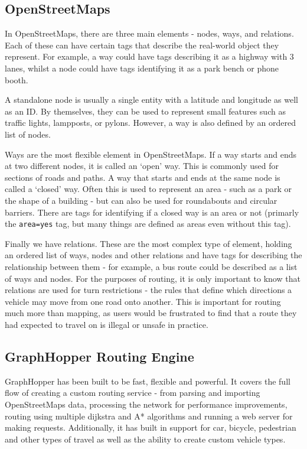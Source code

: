 \documentclass[ %
                    author={Alexander Hill},
                supervisor={Dr. Benjamin Sach},
                    degree={MEng},
                     title={MARMOSET},
                  subtitle={Multi-Agent Route Management using Online Simulation for Efficient Transportation},
                      type={research},
                      year={2016} ]{dissertation}
\begin{document}
\subsection{OpenStreetMaps}

In OpenStreetMaps, there are three main elements - nodes, ways, and
relations. Each of these can have certain tags that describe the real-world
object they represent. For example, a way could have tags describing it as a
highway with 3 lanes, whilst a node could have tags identifying it as a
park bench or phone booth.

A standalone node is usually a single entity with a latitude and longitude as
well as an ID. By themselves, they can be used to represent small features such
as traffic lights, lampposts, or pylons. However, a way is also defined
by an ordered list of nodes.

Ways are the most flexible element in OpenStreetMaps. If a way starts and ends
at two different nodes, it is called an `open' way. This is commonly used for
sections of roads and paths. A way that starts and ends at the same node is
called a `closed' way. Often this is used to represent an area - such as a park
or the shape of a building - but can also be used for roundabouts and circular
barriers. There are tags for identifying if a closed way is an area or not
(primarly the \texttt{area=yes} tag, but many things are defined as areas even
without this tag).

Finally we have relations. These are the most complex type of element, holding
an ordered list of ways, nodes and other relations and have tags for describing
the relationship between them - for example, a bus route could be described as a
list of ways and nodes. For the purposes of routing, it is only important to
know that relations are used for turn restrictions - the rules that define which
directions a vehicle may move from one road onto another. This is important for
routing much more than mapping, as users would be frustrated to find that a
route they had expected to travel on is illegal or unsafe in practice.

\subsection{GraphHopper Routing Engine}

GraphHopper has been built to be fast, flexible and powerful. It covers the full
flow of creating a custom routing service - from parsing and importing
OpenStreetMaps data, processing the network for performance improvements,
routing using multiple dijkstra and A* algorithms and running a web server for
making requests. Additionally, it has built in support for car,
bicycle, pedestrian and other types of travel as well as the ability to create
custom vehicle types.
\end{document}
